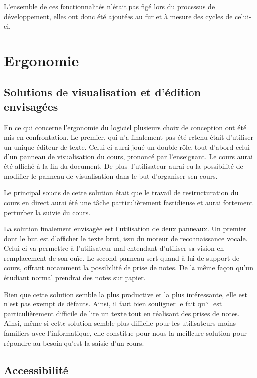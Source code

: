 L'ensemble de ces fonctionnalités n'était pas figé lors du processus de développement, elles ont donc été ajoutées au fur et à mesure des cycles de celui-ci.

\section{Ergonomie}

\subsection{Solutions de visualisation et d'édition envisagées}

En ce qui concerne l'ergonomie du logiciel plusieurs choix de conception ont été mis en confrontation. Le premier, qui n'a finalement pas été retenu était d'utiliser un unique éditeur de texte. Celui-ci aurai joué un  double rôle, tout d'abord celui d'un panneau de visualisation du cours, prononcé par l'enseignant. Le cours aurai été affiché à la fin du document. De plus, l'utilisateur aurai eu la possibilité de modifier le panneau de visualisation dans le but d'organiser son  cours.

Le principal soucis de cette solution était que le travail de restructuration du cours en direct aurai été une tâche particulièrement fastidieuse et aurai fortement perturber la suivie du cours.

La solution finalement envisagée est l'utilisation de deux panneaux. Un premier dont le but est d'afficher le texte brut, issu du moteur de reconnaissance vocale. Celui-ci  va permettre à l'utilisateur mal entendant d'utiliser sa  vision en remplacement de son ouïe. Le second panneau sert quand à lui de support de cours, offrant notamment la possibilité de prise de notes. De la même façon qu'un étudiant normal prendrai des notes sur papier.

Bien que cette solution semble la plus productive et la plus intéressante, elle est n'est pas exempt de défauts. Ainsi, il faut bien souligner le fait qu'il est particulièrement difficile de lire un texte tout en réalisant des prises de notes. Ainsi, même si cette solution semble plus difficile pour les utilisateurs moins familiers avec l'informatique, elle constitue pour nous la meilleure solution pour répondre au besoin qu'est la saisie d'un cours.




\subsection{Accessibilité}

